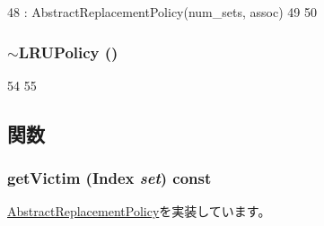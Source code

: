\begin{DoxyCode}
48     : AbstractReplacementPolicy(num_sets, assoc)
49 {
50 }
\end{DoxyCode}
\hypertarget{classLRUPolicy_aaa3d5ea7f1de71a3154582b87406249d}{
\subsubsection[{$\sim$LRUPolicy}]{\setlength{\rightskip}{0pt plus 5cm}$\sim${\bf LRUPolicy} ()}}
\label{classLRUPolicy_aaa3d5ea7f1de71a3154582b87406249d}



\begin{DoxyCode}
54 {
55 }
\end{DoxyCode}


\subsection{関数}
\hypertarget{classLRUPolicy_aad2c302009bdae8c2f86d7c4e0ed2c8f}{
\subsubsection[{getVictim}]{ getVictim ({\bf Index} {\em set}) const}}
\label{classLRUPolicy_aad2c302009bdae8c2f86d7c4e0ed2c8f}


\hyperlink{classAbstractReplacementPolicy_a100bd69954d47ece014cbd697a1f8d7f}{AbstractReplacementPolicy}を実装しています。


